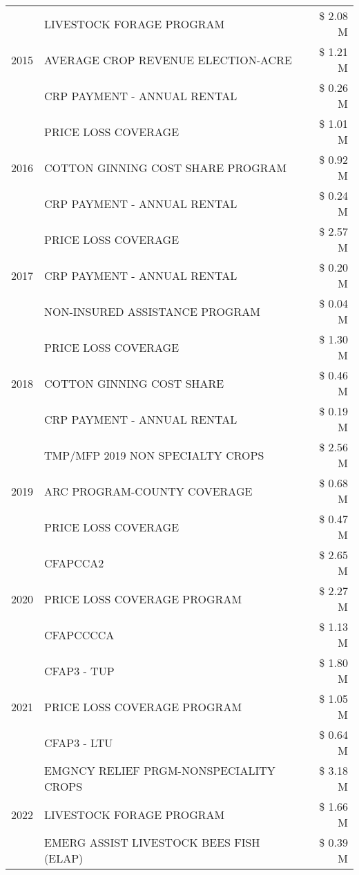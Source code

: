 \begin{tabular}{llr}
\cline{1-3}
\multirow[t]{3}{*}{2015} & LIVESTOCK FORAGE PROGRAM & \$ 2.08 M \\
 & AVERAGE CROP REVENUE ELECTION-ACRE & \$ 1.21 M \\
 & CRP PAYMENT - ANNUAL RENTAL & \$ 0.26 M \\
\cline{1-3}
\multirow[t]{3}{*}{2016} & PRICE LOSS COVERAGE & \$ 1.01 M \\
 & COTTON GINNING COST SHARE PROGRAM & \$ 0.92 M \\
 & CRP PAYMENT - ANNUAL RENTAL & \$ 0.24 M \\
\cline{1-3}
\multirow[t]{3}{*}{2017} & PRICE LOSS COVERAGE & \$ 2.57 M \\
 & CRP PAYMENT - ANNUAL RENTAL & \$ 0.20 M \\
 & NON-INSURED ASSISTANCE PROGRAM & \$ 0.04 M \\
\cline{1-3}
\multirow[t]{3}{*}{2018} & PRICE LOSS COVERAGE & \$ 1.30 M \\
 & COTTON GINNING COST SHARE & \$ 0.46 M \\
 & CRP PAYMENT - ANNUAL RENTAL & \$ 0.19 M \\
\cline{1-3}
\multirow[t]{3}{*}{2019} & TMP/MFP 2019 NON SPECIALTY CROPS & \$ 2.56 M \\
 & ARC PROGRAM-COUNTY COVERAGE & \$ 0.68 M \\
 & PRICE LOSS COVERAGE & \$ 0.47 M \\
\cline{1-3}
\multirow[t]{3}{*}{2020} & CFAPCCA2 & \$ 2.65 M \\
 & PRICE LOSS COVERAGE PROGRAM & \$ 2.27 M \\
 & CFAPCCCCA & \$ 1.13 M \\
\cline{1-3}
\multirow[t]{3}{*}{2021} & CFAP3 - TUP & \$ 1.80 M \\
 & PRICE LOSS COVERAGE PROGRAM & \$ 1.05 M \\
 & CFAP3 - LTU & \$ 0.64 M \\
\cline{1-3}
\multirow[t]{3}{*}{2022} & EMGNCY RELIEF PRGM-NONSPECIALITY CROPS & \$ 3.18 M \\
 & LIVESTOCK FORAGE PROGRAM & \$ 1.66 M \\
 & EMERG ASSIST LIVESTOCK BEES FISH (ELAP) & \$ 0.39 M \\
\cline{1-3}
\bottomrule
\end{tabular}
